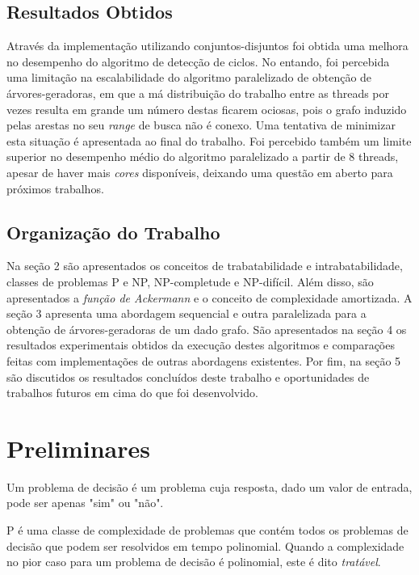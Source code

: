 \documentclass[article,a4paper,12pt,brazil,sumario=tradicional]{abntex2}
\theoremstyle{definition} %
\begin{document}
\subsection{Resultados Obtidos}

Através da implementação utilizando conjuntos-disjuntos foi obtida uma melhora no desempenho do algoritmo de detecção de ciclos. No entando, foi percebida uma limitação na escalabilidade do algoritmo paralelizado de obtenção de árvores-geradoras, em que a má distribuição do trabalho entre as threads por vezes resulta em grande um número destas ficarem ociosas, pois o grafo induzido pelas arestas no seu \textit{range} de busca não é conexo. Uma tentativa de minimizar esta situação é apresentada ao final do trabalho. Foi percebido também um limite superior no desempenho médio do algoritmo paralelizado a partir de 8 threads, apesar de haver mais \textit{cores} disponíveis, deixando uma questão em aberto para próximos trabalhos.

\subsection{Organização do Trabalho}

Na seção 2 são apresentados os conceitos de trabatabilidade e intrabatabilidade, classes de problemas P e NP, NP-completude e NP-difícil. Além disso, são apresentados a \textit{função de Ackermann} e o conceito de complexidade amortizada. A seção 3 apresenta uma abordagem sequencial e outra paralelizada para a obtenção de árvores-geradoras de um dado grafo. São apresentados na seção 4 os resultados experimentais obtidos da execução destes algoritmos e comparações feitas com implementações de outras abordagens existentes. Por fim, na seção 5 são discutidos os resultados concluídos deste trabalho e oportunidades de trabalhos futuros em cima do que foi desenvolvido.

\section{Preliminares}

Um problema de decisão é um problema cuja resposta, dado um valor de entrada, pode ser apenas "sim" ou "não".

P é uma classe de complexidade de problemas que contém todos os problemas de decisão que podem ser resolvidos em tempo polinomial. Quando a complexidade no pior caso para um problema de decisão é polinomial, este é dito \textit{tratável}.
\end{document}
